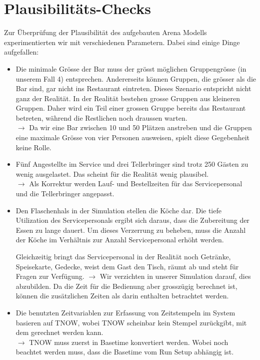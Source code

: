 \documentclass[ngerman,a4paper,12pt]{scrreprt}
\begin{document}
	\section{Plausibilitäts-Checks}
	Zur Überprüfung der Plausibilität des aufgebauten Arena Modells experimentierten wir mit verschiedenen Parametern. Dabei sind einige Dinge aufgefallen:
	\begin{itemize}
		\item Die minimale Grösse der Bar muss der grösst möglichen Gruppengrösse (in unserem Fall 4) entsprechen. Andererseits können Gruppen, die grösser als die Bar sind, gar nicht ins Restaurant eintreten.
		Dieses Szenario entspricht nicht ganz der Realität. In der Realität bestehen grosse Gruppen aus kleineren Gruppen. Daher wird ein Teil einer grossen Gruppe bereits das Restaurant betreten, während die Restlichen noch draussen warten.\\
		$\rightarrow$ Da wir eine Bar zwischen 10 und 50 Plätzen anstreben und die Gruppen eine maximale Grösse von vier Personen ausweisen, spielt diese Gegebenheit keine Rolle.
		\item Fünf Angestellte im Service und drei Tellerbringer sind trotz 250 Gästen zu wenig ausgelastet. Das scheint für die Realität wenig plausibel.\\
		$\rightarrow$ Als Korrektur werden Lauf- und Bestellzeiten für das Servicepersonal und die Tellerbringer angepasst.
		\item Den Flaschenhals in der Simulation stellen die Köche dar. Die tiefe Utilization des Servicepersonals ergibt sich daraus, dass die Zubereitung der Essen zu lange dauert. Um dieses Verzerrung zu beheben, muss die Anzahl der Köche im Verhältnis zur Anzahl Servicepersonal erhöht werden.
		
		Gleichzeitig bringt das Servicepersonal in der Realität noch Getränke, Speisekarte, Gedecke, weist dem Gast den Tisch, räumt ab und steht für Fragen zur Verfügung.
		$\rightarrow$ Wir verzichten in unserer Simulation darauf, dies abzubilden. Da die Zeit für die Bedienung aber grosszügig berechnet ist, können die zusätzlichen Zeiten als darin enthalten betrachtet werden.
		\item Die benutzten Zeitvariablen zur Erfassung von Zeitstempeln im System basieren auf TNOW, wobei TNOW scheinbar kein Stempel zurückgibt, mit dem gerechnet werden kann.\\
		$\rightarrow$ TNOW muss zuerst in Basetime konvertiert werden. Wobei noch beachtet werden muss, dass die Basetime vom Run Setup abhängig ist.
	\end{itemize}
			
\end{document}
